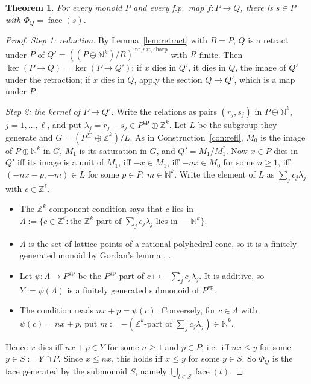 \documentclass[11pt]{article}
\newtheorem{theorem}{Theorem}[section]
\theoremstyle{definition}
\theoremstyle{remark}
\newcommand{\N}{\mathbb{N}}
\newcommand{\Z}{\mathbb{Z}}
\newcommand{\gp}{\mathrm{gp}}
\newcommand{\face}{\operatorname{face}}
\newcommand{\rfl}{\mathrm{int,sat,sharp}}
\begin{document}
\begin{theorem}\label{thm:B}
For every monoid $P$ and every f.p.\ map $f\colon P\to Q$, there is $s\in P$ with $\Phi_Q=\face(s)$.
\end{theorem}
\begin{proof}
\emph{Step 1: reduction.} By Lemma~\ref{lem:retract} with $B=P$, $Q$ is a retract under $P$ of $Q'=((P\oplus\N^k)/R)^{\rfl}$ with $R$ finite. Then $\ker(P\to Q)=\ker(P\to Q')$: if $x$ dies in $Q'$, it dies in $Q$, the image of $Q'$ under the retraction; if $x$ dies in $Q$, apply the section $Q\to Q'$, which is a map under $P$.

\emph{Step 2: the kernel of $P\to Q'$.} Write the relations as pairs $(r_j,s_j)$ in $P\oplus\N^k$, $j=1,\dots,\ell$, and put $\lambda_j=r_j-s_j\in P^{\gp}\oplus\Z^k$. Let $L$ be the subgroup they generate and $G=(P^{\gp}\oplus\Z^k)/L$. As in Construction~\ref{con:refl}, $M_0$ is the image of $P\oplus\N^k$ in $G$, $M_1$ is its saturation in $G$, and $Q'=M_1/M_1^*$. Now $x\in P$ dies in $Q'$ iff its image is a unit of $M_1$, iff $-x\in M_1$, iff $-nx\in M_0$ for some $n\ge1$, iff $(-nx-p,-m)\in L$ for some $p\in P$, $m\in\N^k$. Write the element of $L$ as $\sum_jc_j\lambda_j$ with $c\in\Z^\ell$.
\begin{itemize}
\item The $\Z^k$-component condition says that $c$ lies in $\Lambda:=\{c\in\Z^\ell:\text{the }\Z^k\text{-part of }\sum_jc_j\lambda_j\text{ lies in }-\N^k\}$.
\item $\Lambda$ is the set of lattice points of a rational polyhedral cone, so it is a finitely generated monoid by Gordan's lemma \cite{Gordan}, \cite[\S1.2]{Fulton}.
\item Let $\psi\colon\Lambda\to P^{\gp}$ be the $P^{\gp}$-part of $c\mapsto-\sum_jc_j\lambda_j$. It is additive, so $Y:=\psi(\Lambda)$ is a finitely generated submonoid of $P^{\gp}$.
\item The condition reads $nx+p=\psi(c)$. Conversely, for $c\in\Lambda$ with $\psi(c)=nx+p$, put $m:=-(\Z^k\text{-part of }\sum_jc_j\lambda_j)\in\N^k$.
\end{itemize}
Hence $x$ dies iff $nx+p\in Y$ for some $n\ge1$ and $p\in P$, i.e.\ iff $nx\le y$ for some $y\in S:=Y\cap P$. Since $x\le nx$, this holds iff $x\le y$ for some $y\in S$. So $\Phi_Q$ is the face generated by the submonoid $S$, namely $\bigcup_{t\in S}\face(t)$.


\end{proof}
\end{document}
